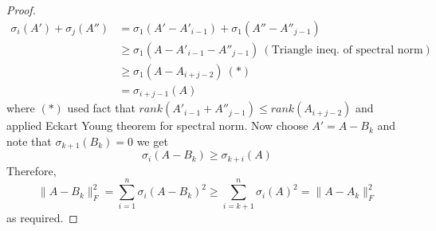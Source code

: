 \documentclass[../book-template.tex]{subfiles}
\begin{document}
\begin{proof}
\begin{align*}
    \sigma_i(A')+\sigma_j(A'') &= \sigma_1(A'-A'_{i-1})+\sigma_1(A''-A''_{j-1})\\
    &\geq \sigma_1(A-A'_{i-1}-A''_{j-1})\ (\text{Triangle ineq. of spectral norm})\\
    &\geq \sigma_1(A-A_{i+j-2})\ (*)\\
    &=\sigma_{i+j-1}(A)
\end{align*}
where $(*)$ used fact that $rank(A'_{i-1}+A''_{j-1})\leq rank(A_{i+j-2})$ and applied Eckart Young theorem for spectral norm. Now choose $A'=A-B_k$ and note that $\sigma_{k+1}(B_k)=0$ we get
\begin{equation*}
    \sigma_i(A-B_k)\geq \sigma_{k+i}(A)
\end{equation*}
Therefore,
\begin{equation*}
    \|A-B_k\|_F^2 = \sum_{i=1}^{n}\sigma_i(A-B_k)^2\geq \sum_{i=k+1}^{n}\sigma_i(A)^2 = \|A-A_k\|_F^2
\end{equation*}
as required.
\end{proof}
\end{document}
